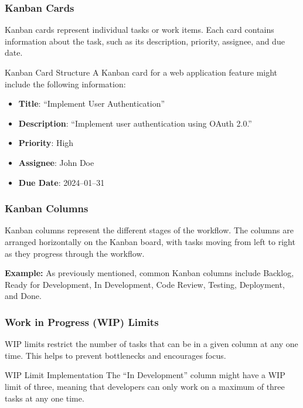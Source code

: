 \subsubsection{Kanban Cards}

Kanban cards represent individual tasks or work items. Each card contains
information about the task, such as its description, priority, assignee, and
due date.

\begin{examplecard}{Kanban Card Structure}
  A Kanban card for a web application feature might include the following information:
  \begin{itemize}
    \item \textbf{Title}: ``Implement User Authentication''
    \item \textbf{Description}: ``Implement user authentication using OAuth 2.0.''
    \item \textbf{Priority}: High
    \item \textbf{Assignee}: John Doe
    \item \textbf{Due Date}: 2024--01--31
  \end{itemize}
\end{examplecard}

\subsubsection{Kanban Columns}

Kanban columns represent the different stages of the workflow. The columns are
arranged horizontally on the Kanban board, with tasks moving from left to right
as they progress through the workflow.

\textbf{Example:} As previously mentioned, common Kanban columns include Backlog, Ready for Development, In Development, Code Review, Testing, Deployment, and Done.

\subsubsection{Work in Progress (WIP) Limits}

WIP limits restrict the number of tasks that can be in a given column at any
one time. This helps to prevent bottlenecks and encourages focus.

\begin{examplecard}{WIP Limit Implementation}
  The ``In Development'' column might have a WIP limit of three, meaning that developers can only work on a maximum of three tasks at any one time.
\end{examplecard}

